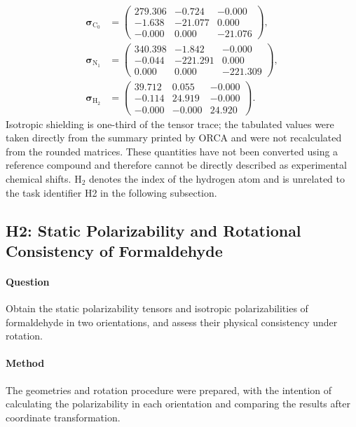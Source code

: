 \documentclass[a4paper,11pt]{article}
\begin{document}
\begin{equation}
  \begin{aligned}
    \bm{\sigma}_{\mathrm{C}_0}&=\begin{pmatrix}
      279.306 & -0.724 & -0.000 \\
      -1.638 & -21.077 & 0.000 \\
      -0.000 & 0.000 & -21.076
    \end{pmatrix},\\[0.8em]
    \bm{\sigma}_{\mathrm{N}_1}&=\begin{pmatrix}
      340.398 & -1.842 & -0.000 \\
      -0.044 & -221.291 & 0.000 \\
      0.000 & 0.000 & -221.309
    \end{pmatrix},\\[0.8em]
    \bm{\sigma}_{\mathrm{H}_2}&=\begin{pmatrix}
      39.712 & 0.055 & -0.000 \\
      -0.114 & 24.919 & -0.000 \\
      -0.000 & -0.000 & 24.920
    \end{pmatrix}.
  \end{aligned}
  \label{eq:h1-tensors}
\end{equation}
Isotropic shielding is one-third of the tensor trace; the tabulated values were taken directly from the summary printed by ORCA and were not recalculated from the rounded matrices.
These quantities have not been converted using a reference compound and therefore cannot be directly described as experimental chemical shifts.
H$_2$ denotes the index of the hydrogen atom and is unrelated to the task identifier H2 in the following subsection.

\subsection{H2: Static Polarizability and Rotational Consistency of Formaldehyde}
\paragraph{Question}
Obtain the static polarizability tensors and isotropic polarizabilities of formaldehyde in two orientations, and assess their physical consistency under rotation.

\paragraph{Method}
The geometries and rotation procedure were prepared, with the intention of calculating the polarizability in each orientation and comparing the results after coordinate transformation.
\end{document}
